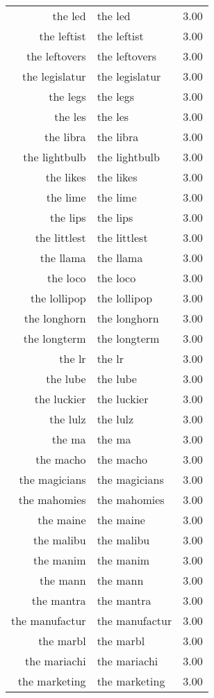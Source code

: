 \begin{table}[ht]
\begin{tabular}{rlr}
  the led & the led & 3.00 \\ 
  the leftist & the leftist & 3.00 \\ 
  the leftovers & the leftovers & 3.00 \\ 
  the legislatur & the legislatur & 3.00 \\ 
  the legs & the legs & 3.00 \\ 
  the les & the les & 3.00 \\ 
  the libra & the libra & 3.00 \\ 
  the lightbulb & the lightbulb & 3.00 \\ 
  the likes & the likes & 3.00 \\ 
  the lime & the lime & 3.00 \\ 
  the lips & the lips & 3.00 \\ 
  the littlest & the littlest & 3.00 \\ 
  the llama & the llama & 3.00 \\ 
  the loco & the loco & 3.00 \\ 
  the lollipop & the lollipop & 3.00 \\ 
  the longhorn & the longhorn & 3.00 \\ 
  the longterm & the longterm & 3.00 \\ 
  the lr & the lr & 3.00 \\ 
  the lube & the lube & 3.00 \\ 
  the luckier & the luckier & 3.00 \\ 
  the lulz & the lulz & 3.00 \\ 
  the ma & the ma & 3.00 \\ 
  the macho & the macho & 3.00 \\ 
  the magicians & the magicians & 3.00 \\ 
  the mahomies & the mahomies & 3.00 \\ 
  the maine & the maine & 3.00 \\ 
  the malibu & the malibu & 3.00 \\ 
  the manim & the manim & 3.00 \\ 
  the mann & the mann & 3.00 \\ 
  the mantra & the mantra & 3.00 \\ 
  the manufactur & the manufactur & 3.00 \\ 
  the marbl & the marbl & 3.00 \\ 
  the mariachi & the mariachi & 3.00 \\ 
  the marketing & the marketing & 3.00 \\ 

\end{tabular}
\end{table}
